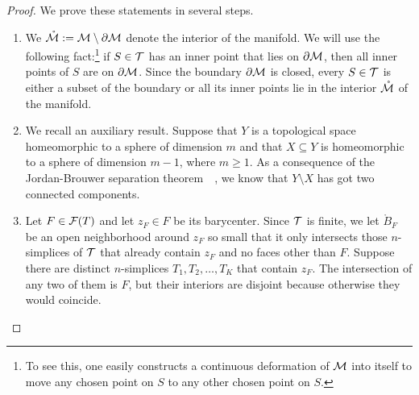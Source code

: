 \documentclass[10pt,letterpaper]{article}
\begin{document}
\begin{proof}
    We prove these statements in several steps.
    \begin{enumerate}
    \item 
    We $\mathring {{\mathcal M}} := {\mathcal M} \setminus \partial {\mathcal M}$ denote the interior of the manifold. 
    We will use the following fact:\footnote{To see this, one easily constructs a continuous deformation of ${\mathcal M}$ into itself to move any chosen point on $S$ to any other chosen point on $S$.} if $S \in {\mathcal T}$ has an inner point that lies on $\partial {\mathcal M}$, then all inner points of $S$ are on $\partial {\mathcal M}$. 
    Since the boundary $\partial {\mathcal M}$ is closed, every $S \in {\mathcal T}$ is either a subset of the boundary or all its inner points lie in the interior $\mathring {{\mathcal M}}$ of the manifold. 
    
    \item 
    We recall an auxiliary result.
    Suppose that $Y$ is a topological space homeomorphic to a sphere of dimension $m$ and that $X \subseteq Y$ is homeomorphic to a sphere of dimension $m-1$, where $m \geq 1$. 
    As a consequence of the Jordan-Brouwer separation theorem~\cite[Corollary IV.5.24]{mayer1989algebraische}~\cite[Corollary VIII.6.4]{massey1981algebraic}, 
    we know that $Y \setminus X$ has got two connected components.
    
    
    \item
    Let $F \in {\mathcal F}(T)$ and let $z_F \in F$ be its barycenter. 
    Since ${\mathcal T}$ is finite, we let $\mathring B_F$ be an open neighborhood around $z_F$ so small that it only intersects those $n$-simplices of ${\mathcal T}$ that already contain $z_F$ and no faces other than $F$.
    Suppose there are distinct $n$-simplices $T_1, T_2, \dots, T_K$ that contain $z_F$. 
    The intersection of any two of them is $F$, but their interiors are disjoint because otherwise they would coincide. 
    

\end{enumerate}
\end{proof}
\end{document}
